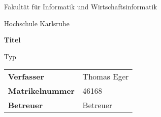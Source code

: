 \pagestyle{empty}
\vspace{-20mm}
\begin{center}
\begin{Huge}
Fakultät für Informatik und Wirtschaftsinformatik\\

\vspace{10mm}
\end{Huge}{\Large Hochschule Karlsruhe}\\

\vspace{40mm}
\begin{Large}
\textbf{
	Titel\\
}
\end{Large}
\vspace{10mm}
Typ\\

\vspace{55mm}
\begin{tabular}{ll}
{\bf Verfasser}&Thomas Eger \\
{\bf Matrikelnummer}&46168\\
{\bf Betreuer}& Betreuer\\
\end{tabular}

\end{center}
\clearpage

